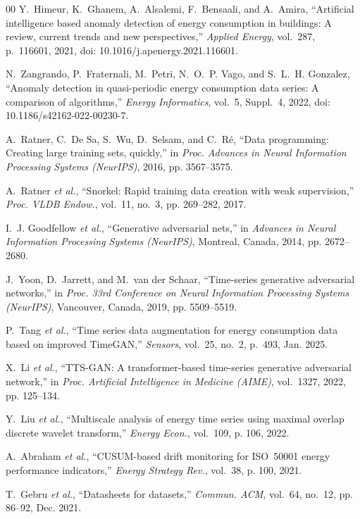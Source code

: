 \begin{thebibliography}{00}
Y.~Himeur, K.~Ghanem, A.~Alsalemi, F.~Bensaali, and A.~Amira,
``Artificial intelligence based anomaly detection of energy consumption
in buildings: A review, current trends and new perspectives,''
\emph{Applied Energy}, vol.~287, p.~116601, 2021,
doi: 10.1016/j.apenergy.2021.116601.

N.~Zangrando, P.~Fraternali, M.~Petri, N.~O.~P. Vago, and
S.~L.~H. Gonzalez, ``Anomaly detection in quasi-periodic energy
consumption data series: A comparison of algorithms,''
\emph{Energy Informatics}, vol.~5, Suppl.~4, 2022,
doi: 10.1186/s42162-022-00230-7.

A.~Ratner, C.~De Sa, S.~Wu, D.~Selsam, and C.~Ré,
``Data programming: Creating large training sets, quickly,''
in \emph{Proc. Advances in Neural Information Processing
Systems (NeurIPS)}, 2016, pp. 3567--3575.

A.~Ratner \emph{et al.}, ``Snorkel: Rapid training data creation
with weak supervision,'' \emph{Proc. VLDB Endow.},
vol.~11, no.~3, pp. 269--282, 2017.

I.~J. Goodfellow \emph{et al.}, ``Generative adversarial nets,''
in \emph{Advances in Neural Information Processing Systems
(NeurIPS)}, Montreal, Canada, 2014, pp. 2672--2680.

J.~Yoon, D.~Jarrett, and M.~van der Schaar, ``Time-series
generative adversarial networks,''
in \emph{Proc. 33rd
Conference on Neural Information Processing Systems (NeurIPS)},
Vancouver, Canada, 2019, pp. 5509--5519.

P.~Tang \emph{et al.}, ``Time series data augmentation for
energy consumption data based on improved TimeGAN,''
\emph{Sensors}, vol.~25, no.~2, p.~493, Jan. 2025.

X.~Li \emph{et al.}, ``TTS-GAN: A transformer-based time-series
generative adversarial network,''
in \emph{Proc. Artificial Intelligence in Medicine (AIME)},
vol.~1327, 2022, pp. 125--134.

Y.~Liu \emph{et al.}, ``Multiscale analysis of energy time series
using maximal overlap discrete wavelet transform,''
\emph{Energy Econ.}, vol.~109, p. 106, 2022.

A.~Abraham \emph{et al.}, ``CUSUM-based drift monitoring for
ISO~50001 energy performance indicators,''
\emph{Energy Strategy Rev.}, vol.~38, p. 100, 2021.

T.~Gebru \emph{et al.}, ``Datasheets for datasets,''
\emph{Commun. ACM}, vol.~64, no.~12, pp. 86--92, Dec. 2021.

\end{thebibliography}
